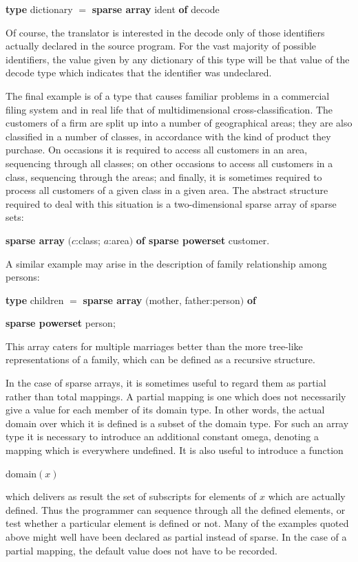 \quad \textbf{type} dictionary $=$ \textbf{sparse array} ident \textbf{of} decode

\noindent
Of course, the translator is interested in the decode only of those identifiers actually declared in the source program. For the vast majority of possible identifiers, the value given by any dictionary of this type will be that value of the decode type which indicates that the identifier was undeclared.

The final example is of a type that causes familiar problems in a commercial filing system and in real life \textemdash{} that of multidimensional cross-classification. The customers of a firm are split up into a number of geographical areas; they are also classified in a number of classes, in accordance with the kind of product they purchase. On occasions it is required to access all customers in an area, sequencing through all classes; on other occasions to access all customers in a class, sequencing through the areas; and finally, it is sometimes required to process all customers of a given class in a given area. The abstract structure required to deal with this situation is a two-dimensional sparse array of sparse sets:

\quad \textbf{sparse array} $(c$:class; $a$:area$)$ \textbf{of sparse powerset} customer.

A similar example may arise in the description of family relationship among persons:

\quad \textbf{type} children $=$ \textbf{sparse array} $($mother, father:person$)$ \textbf{of} 

\tabto*{9.2em}\textbf{sparse powerset} person;

\noindent
This array caters for multiple marriages better than the more tree-like representations of a family, which can be defined as a recursive structure.

In the case of sparse arrays, it is sometimes useful to regard them as partial rather than total mappings. A partial mapping is one which does not necessarily give a value for each member of its domain type. In other words, the actual domain over which it is defined is a subset of the domain type. For such an array type it is necessary to introduce an additional constant omega, denoting a mapping which is everywhere undefined. It is also useful to introduce a function

\quad domain$(x)$

\noindent
which delivers as result the set of subscripts for elements of $x$ which are actually defined. Thus the programmer can sequence through all the defined elements, or test whether a particular element is defined or not. Many of the examples quoted above might well have been declared as partial instead of sparse. In the case of a partial mapping, the default value does not have to be recorded.

